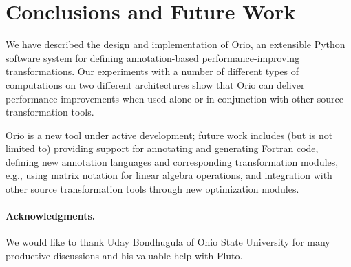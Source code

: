 \section{Conclusions and Future Work}
\label{sec:conclusions}



We have described the design and implementation of Orio, an extensible Python
software system for defining annotation-based performance-improving
transformations. Our experiments with a number of different types of
computations on two different architectures show that Orio can deliver
performance improvements when used alone or in conjunction with other source
transformation tools.

Orio is a new tool under active development; future work includes (but is not
limited to) providing support for annotating and generating Fortran code,
defining new annotation languages and corresponding transformation modules,
e.g., using matrix notation for linear algebra operations, and integration
with other source transformation tools through new optimization modules.

\vspace{-.1in} 
\paragraph{Acknowledgments.} We would like to thank
Uday Bondhugula of Ohio State University for many productive discussions and
his valuable help with Pluto.

\vspace{-.1in} 
